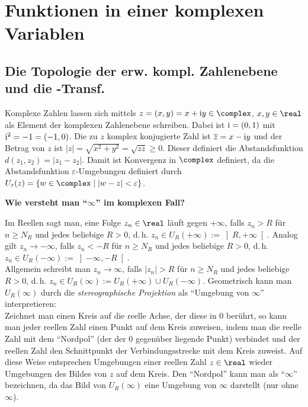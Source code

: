 \section{%
    Funktionen in einer komplexen Variablen%
}

\subsection{%
    Die Topologie der erw. kompl. Zahlenebene und die
    -Transf.%
}

Komplexe Zahlen lassen sich mittels $z = (x, y) = x + \i y \in \complex$,
$x, y \in \real$
als Element der komplexen Zahlenebene schreiben.
Dabei ist $\mathrm{i} = (0, 1)$ mit $\mathrm{i}^2 = -1 = (-1, 0)$.
Die zu $z$ komplex konjugierte Zahl ist $\overline{z} = x - \mathrm{i} y$ und
der Betrag von $z$ ist $|z| = \sqrt{x^2 + y^2} = \sqrt{z \overline{z}} \ge 0$.
Dieser definiert die Abstandsfunktion $d(z_1, z_2) = |z_1 - z_2|$.
Damit ist Konvergenz in $\complex$ definiert, da die Abstandsfunktion
$\varepsilon$-Umgebungen definiert durch
$U_\varepsilon(z) = \{w \in \complex \;|\; |w - z| < \varepsilon\}$.

\linie

\textbf{Wie versteht man "`$\infty$"' im komplexen Fall?}

Im Reellen sagt man, eine Folge $z_n \in \real$ läuft gegen $+\infty$,
falls $z_n > R$ für $n \ge N_R$ und jedes beliebige $R> 0$, d.\,h.
$z_n \in U_R(+\infty) := \left]R, +\infty\right[$.
Analog gilt $z_n \to -\infty$,
falls $z_n < -R$ für $n \ge N_R$ und jedes beliebige $R > 0$, d.\,h.
$z_n \in U_R(-\infty) := \left]-\infty, -R\right[$.\\
Allgemein schreibt man $z_n \to \infty$,
falls $|z_n| > R$ für $n \ge N_R$ und jedes beliebige $R > 0$, d.\,h.
$z_n \in U_R(\infty) := U_R(+\infty) \cup U_R(-\infty)$.
Geometrisch kann man $U_R(\infty)$ durch die \emph{stereographische Projektion}
als "`Umgebung von $\infty$"' interpretieren:\\
Zeichnet man einen Kreis auf die reelle Achse, der diese in $0$ berührt, so
kann man jeder reellen Zahl einen Punkt auf dem Kreis zuweisen,
indem man die reelle Zahl mit dem "`Nordpol"'
(der der $0$ gegenüber liegende Punkt) verbindet und der reellen Zahl
den Schnittpunkt der Verbindungsstrecke mit dem Kreis zuweist.
Auf diese Weise entsprechen Umgebungen einer reellen Zahl $z \in \real$
wieder Umgebungen des Bildes von $z$ auf dem Kreis.
Den "`Nordpol"' kann man als
"`$\infty$"' bezeichnen, da das Bild von $U_R(\infty)$ eine Umgebung von
$\infty$ darstellt (nur ohne $\infty$).

